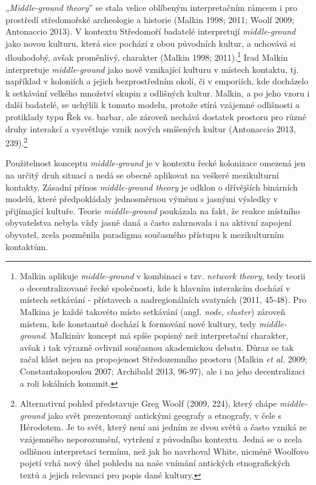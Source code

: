 „{\em Middle-ground theory}” se stala velice oblíbeným interpretačním rámcem i pro prostředí středomořské archeologie a historie (Malkin 1998; 2011; Woolf 2009; Antonaccio 2013). V kontextu Středomoří badatelé interpretují {\em middle-ground} jako novou kulturu, která sice pochází z obou původních kultur, a uchovává si dlouhodobý, avšak proměnlivý, charakter (Malkin 1998; 2011).\footnote{Malkin aplikuje {\em middle-ground} v kombinaci s tzv. {\em network theory}, tedy teorii o decentralizované řecké společnosti, kde k hlavním interakcím dochází v místech setkávání - přístavech a nadregionálních svatyních (2011, 45-48). Pro Malkina je každé takovéto místo setkávání (angl. {\em node}, {\em cluster}) zároveň místem, kde konstantně dochází k formování nové kultury, tedy {\em middle-ground}. Malkinův koncept má spíše popisný než interpretační charakter, avšak i tak výrazně ovlivnil současnou akademickou debatu. Důraz se tak začal klást nejen na propojenost Středozemního prostoru (Malkin {\em et al.} 2009; Constantakopoulou 2007; Archibald 2013, 96-97), ale i na jeho decentralizaci a roli lokálních komunit.} Irad Malkin interpretuje {\em middle-ground} jako nově vznikající kulturu v místech kontaktu, tj. například v koloniích a jejich bezprostředním okolí, či v emporiích, kde docházelo k setkávání velkého množství skupin z odlišných kultur. Malkin, a po jeho vzoru i další badatelé, se uchýlili k tomuto modelu, protože stírá vzájemné odlišnosti a protiklady typu Řek vs. barbar, ale zároveň nechává dostatek prostoru pro různé druhy interakcí a vysvětluje vznik nových smíšených kultur (Antonaccio 2013, 239).\footnote{Alternativní pohled představuje Greg Woolf (2009, 224), který chápe {\em middle-ground} jako svět prezentovaný antickými geografy a etnografy, v čele s Hérodotem. Je to svět, který není ani jedním ze dvou světů a často vzniká ze vzájemného neporozumění, vytržení z původního kontextu. Jedná se o zcela odlišnou interpretaci termínu, než jak ho navrhoval White, nicméně Woolfovo pojetí vrhá nový úhel pohledu na naše vnímání antických etnografických textů a jejich relevanci pro popis dané kultury.}

Použitelnost konceptu {\em middle-ground} je v kontextu řecké kolonizace omezená jen na určitý druh situací a nedá se obecně aplikovat na veškeré mezikulturní kontakty. Zásadní přínos {\em middle-ground theory} je odklon o dřívějších binárních modelů, které předpokládaly jednosměrnou výměnu s jasnými výsledky v přijímající kultuře. Teorie {\em middle-ground} poukázala na fakt, že reakce místního obyvatelstva nebyla vždy jasně daná a často zahrnovala i na aktivní zapojení obyvatel, zcela pozměnila paradigma současného přístupu k mezikulturním kontaktům.


